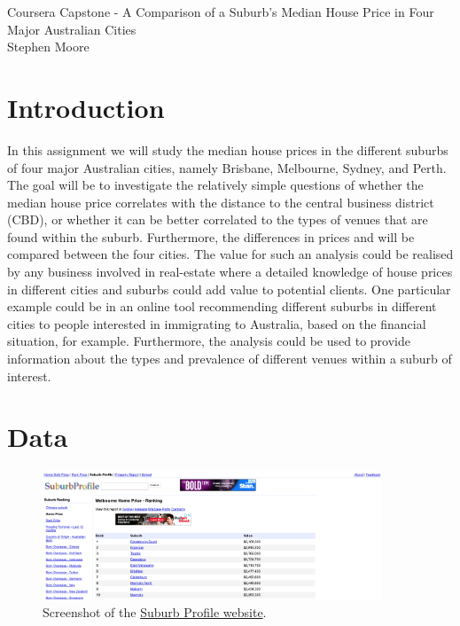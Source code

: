 \documentclass[12pt]{article}
\begin{document}
\begin{center}
    \Large{Coursera Capstone - A Comparison of a Suburb's Median House Price in Four Major Australian Cities}\\
    \vspace{5pt}
    \large{Stephen Moore}
\end{center}

\section{Introduction}

    In this assignment we will study the median house prices in the different suburbs of four major Australian cities, namely Brisbane, Melbourne, Sydney, and Perth. The goal will be to investigate the relatively simple questions of whether the median house price correlates with the distance to the central business district (CBD), or whether it can be better correlated to the types of venues that are found within the suburb. Furthermore, the differences in prices and will be compared between the four cities. The value for such an analysis could be realised by any business involved in real-estate where a detailed knowledge of house prices in different cities and suburbs could add value to potential clients. One particular example could be in an online tool recommending different suburbs in different cities to people interested in immigrating to Australia, based on the financial situation, for example. Furthermore, the analysis could be used to provide information about the types and prevalence of different venues within a suburb of interest.

\section{Data}

    \begin{figure}[h!]
        \begin{center}
            \includegraphics[width=0.9\textwidth,keepaspectratio]{Figures/SuburbProfileScreenShot}
            \caption{Screenshot of the \href{http://house.speakingsame.com/suburbtop.php?sta=qld&cat=HomePrice&name=&page=0}{Suburb Profile website}.}
            \label{Fig:SuburbProfileScreenShot}
        \end{center}
    \end{figure}
\end{document}
